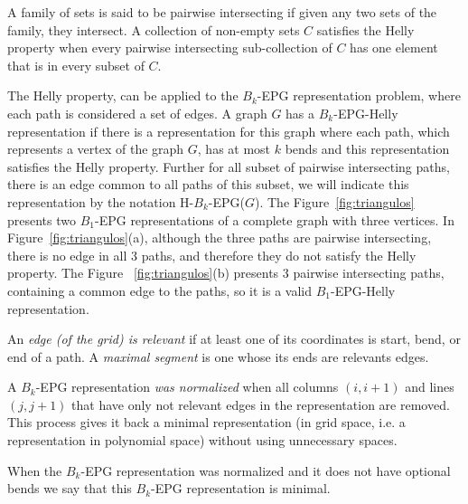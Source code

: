 \documentclass[a4paper,11pt]{article}
\begin{document}
A family of sets is said to be pairwise intersecting if given any two sets of the family, they intersect. A collection of non-empty sets $C$ satisfies the Helly property when every pairwise intersecting sub-collection of $ C $ has one element that is in every subset of $C$.

The Helly property, can be applied to the $ B_k $-EPG representation problem, where each path is considered a set of edges. A graph $ G $ has a  $ B_k$-EPG-Helly representation if there is a representation for this graph where each path, which represents a vertex of the graph $ G $, has at most $ k $ bends and this representation satisfies the Helly property. Further for all subset of pairwise intersecting paths, there is an edge common to all paths of this subset, we will indicate this representation by the notation H-$B_k$-EPG($G$). The Figure~\ref{fig:triangulos} presents two $B_1$-EPG representations of a complete graph with three vertices. In Figure~\ref{fig:triangulos}(a), although the three paths are pairwise intersecting, there is no edge in all 3 paths, and therefore they do not satisfy the Helly property. The Figure~ \ref{fig:triangulos}(b) presents 3 pairwise intersecting paths, containing a common edge to the paths, so it is a valid $ B_1$-EPG-Helly representation.

  

An \emph{edge (of the grid) is relevant} if at least one of its coordinates is start, bend, or end of a path. A  \emph{maximal segment} is one whose its ends are relevants edges.  



A $B_k$-EPG representation \emph{was normalized} when all columns $(i,i+1)$ and lines $(j,j+1)$ that have only not relevant edges in the representation are removed. This process gives it back a minimal representation (in grid space, i.e. a representation in polynomial space)  without using unnecessary spaces. 

When the $B_k$-EPG representation was normalized and it does not have optional bends we say that this $B_k$-EPG representation is minimal.
\end{document}

